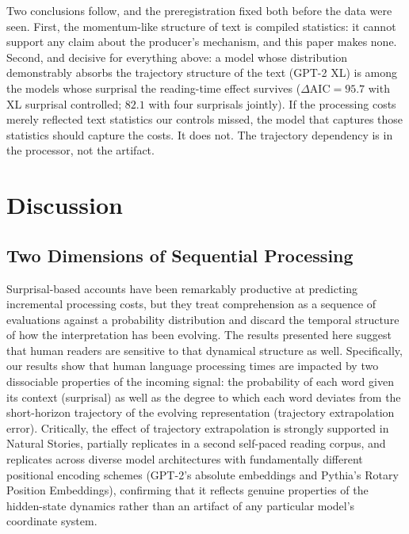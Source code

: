 \documentclass[12pt]{article}
\newcommand{\new}[1]{#1}   %
\begin{document}
{Two conclusions follow, and the preregistration fixed both before the data were seen. First, the momentum-like structure of text is compiled statistics: it cannot support any claim about the producer's mechanism, and this paper makes none. Second, and decisive for everything above: a model whose distribution demonstrably absorbs the trajectory structure of the text (GPT-2 XL) is among the models whose surprisal the reading-time effect survives ($\Delta\text{AIC} = 95.7$ with XL surprisal controlled; $82.1$ with four surprisals jointly). If the processing costs merely reflected text statistics our controls missed, the model that captures those statistics should capture the costs. It does not. The trajectory dependency is in the processor, not the artifact.}

\FloatBarrier

\section{Discussion}

\subsection{Two Dimensions of Sequential Processing}

Surprisal-based accounts have been remarkably productive at predicting incremental processing costs, but they treat comprehension as a sequence of evaluations against a probability distribution and discard the temporal structure of how the interpretation has been evolving. The results presented here suggest that human readers are sensitive to that dynamical structure as well. Specifically, our results show that human language processing times are impacted by two dissociable properties of the incoming signal: the probability of each word given its context (surprisal) as well as the degree to which each word deviates from the short-horizon trajectory of the evolving representation (trajectory extrapolation error). Critically, the effect of trajectory extrapolation \new{is strongly supported in Natural Stories, partially replicates in a second self-paced reading corpus, and replicates across} diverse model architectures with fundamentally different positional encoding schemes (GPT-2's absolute embeddings and Pythia's Rotary Position Embeddings), confirming that it reflects genuine properties of the hidden-state dynamics rather than an artifact of any particular model's coordinate system.
\end{document}
